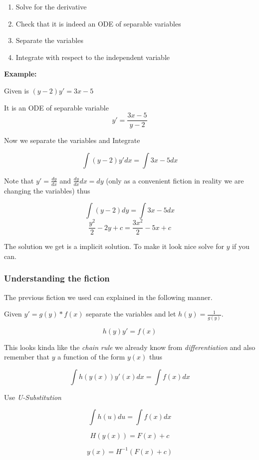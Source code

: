 \begin{enumerate}
    \item Solve for the derivative
    \item Check that it is indeed an ODE of separable variables
    \item Separate the variables
    \item Integrate with respect to the independent variable
\end{enumerate}

\textbf{Example:}
\vspace{\baselineskip}

Given is \((y - 2)y' = 3x - 5\)

It is an ODE of separable variable
\[y' = \frac{3x - 5}{y - 2}\]

Now we separate the variables and Integrate

\[\int (y - 2)y' dx = \int 3x - 5 dx\]

Note that \(y' = \frac{dy}{dx}\) and \( \frac{dy}{dx} dx = dy\) (only as a convenient fiction
in reality we are changing the variables) thus

\[\int (y - 2)dy = \int 3x - 5 dx\]
\[\frac{y^2}{2} - 2y + c = \frac{3x^2}{2} - 5x + c\]

The solution we get is a implicit solution. To make it look nice solve for \(y\)
if you can.

\subsubsection{Understanding the fiction}

The previous fiction we used can explained in the following manner.
\vspace{\baselineskip}

Given \(y' = g(y)*f(x)\) separate the variables and let \(h(y) = \frac{1}{g(y)}\).

\[h(y)y' = f(x)\]

This looks kinda like the \emph{chain rule} we already know from \emph{differentiation} and
also remember that \(y\) a function of the form \(y(x)\) thus

\[\int h(y(x)) y'(x)dx = \int f(x) dx\]

Use \emph{U-Substitution}

\[\int h(u) du = \int f(x) dx\]

\[H(y(x)) = F(x) + c\]

\[y(x) = H^{-1}(F(x) + c)\]

\QED

